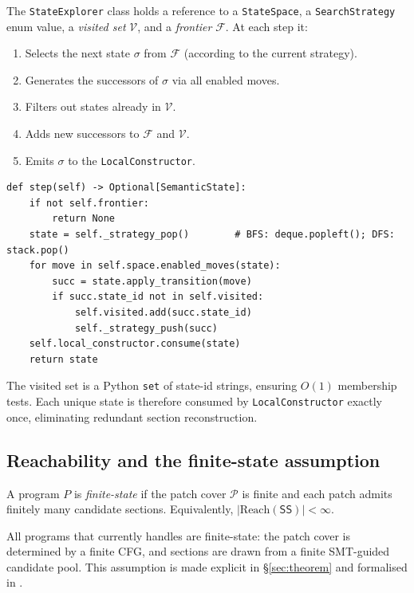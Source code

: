 \documentclass[11pt]{article}
\newcommand{\state}{\sigma}                   %
\newcommand{\frontier}{\mathcal{F}}           %
\newcommand{\visited}{\mathcal{V}}            %
\newcommand{\reach}{\mathrm{Reach}}           %
\newcommand{\patchset}{\mathcal{P}}           %
\begin{document}
The \texttt{StateExplorer} class holds a reference to a
\texttt{StateSpace}, a \texttt{SearchStrategy} enum value, a
\emph{visited set} $\visited$, and a \emph{frontier} $\frontier$.  At
each step it:
\begin{enumerate}[label=(\arabic*)]
  \item Selects the next state $\state$ from $\frontier$ (according to
    the current strategy).
  \item Generates the successors of $\state$ via all enabled moves.
  \item Filters out states already in $\visited$.
  \item Adds new successors to $\frontier$ and $\visited$.
  \item Emits $\state$ to the \texttt{LocalConstructor}.
\end{enumerate}

\begin{lstlisting}[style=jugeo-python, caption={\texttt{StateExplorer.step} (simplified).}]
def step(self) -> Optional[SemanticState]:
    if not self.frontier:
        return None
    state = self._strategy_pop()        # BFS: deque.popleft(); DFS: stack.pop()
    for move in self.space.enabled_moves(state):
        succ = state.apply_transition(move)
        if succ.state_id not in self.visited:
            self.visited.add(succ.state_id)
            self._strategy_push(succ)
    self.local_constructor.consume(state)
    return state
\end{lstlisting}

The visited set is a Python \texttt{set} of state-id strings, ensuring
$O(1)$ membership tests.  Each unique state is therefore consumed by
\texttt{LocalConstructor} exactly once, eliminating redundant section
reconstruction.

\subsection{Reachability and the finite-state assumption}

\begin{definition}\label{def:finite}
A program $P$ is \emph{finite-state} if the patch cover $\patchset$ is
finite and each patch admits finitely many candidate sections.
Equivalently, $|\reach(\mathsf{SS})| < \infty$.
\end{definition}

All programs that \JuGeo{} currently handles are finite-state: the
patch cover is determined by a finite CFG, and sections are drawn from
a finite SMT-guided candidate pool.  This assumption is made explicit
in \S\ref{sec:theorem} and formalised in \LEAN{}.
\end{document}
